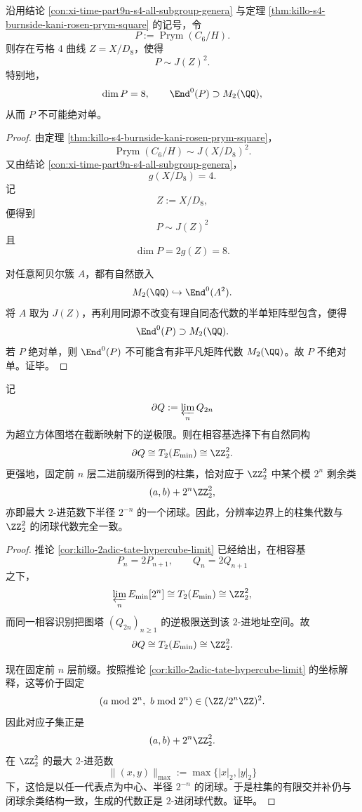 \begin{theorem}\label{thm:xi-time-part9zo-prym-c6h-not-absolutely-simple}
沿用结论 \ref{con:xi-time-part9n-s4-all-subgroup-genera} 与定理 \ref{thm:killo-s4-burnside-kani-rosen-prym-square} 的记号，令
\[
P:=\operatorname{Prym}(C_6/H).
\]
则存在亏格 \(4\) 曲线 \(Z=X/D_8\)，使得
\[
P\sim J(Z)^2.
\]
特别地，
\[
\dim P=8,
\qquad
\End^0(P)\supset M_2(\QQ),
\]
从而 \(P\) 不可能绝对单。
\end{theorem}
\begin{proof}
由定理 \ref{thm:killo-s4-burnside-kani-rosen-prym-square}，
\[
\operatorname{Prym}(C_6/H)\sim J(X/D_8)^2.
\]
又由结论 \ref{con:xi-time-part9n-s4-all-subgroup-genera}，
\[
g(X/D_8)=4.
\]
记
\[
Z:=X/D_8,
\]
便得到
\[
P\sim J(Z)^2
\]
且
\[
\dim P=2g(Z)=8.
\]

对任意阿贝尔簇 \(A\)，都有自然嵌入
\[
M_2(\QQ)\hookrightarrow \End^0(A^2).
\]
将 \(A\) 取为 \(J(Z)\)，再利用同源不改变有理自同态代数的半单矩阵型包含，便得
\[
\End^0(P)\supset M_2(\QQ).
\]
若 \(P\) 绝对单，则 \(\End^0(P)\) 不可能含有非平凡矩阵代数 \(M_2(\QQ)\)。故 \(P\) 不绝对单。证毕。
\end{proof}

\begin{theorem}\label{thm:xi-time-part9zo-dyadic-boundary-cylinder-ball-identification}
记
\[
\partial Q:=\varprojlim_n Q_{2n}
\]
为超立方体图塔在截断映射下的逆极限。则在相容基选择下有自然同构
\[
\partial Q\cong T_2(E_{\min})\cong \ZZ_2^2.
\]
更强地，固定前 \(n\) 层二进前缀所得到的柱集，恰对应于 \(\ZZ_2^2\) 中某个模 \(2^n\) 剩余类
\[
(a,b)+2^n\ZZ_2^2,
\]
亦即最大 \(2\)-进范数下半径 \(2^{-n}\) 的一个闭球。因此，分辨率边界上的柱集代数与 \(\ZZ_2^2\) 的闭球代数完全一致。
\end{theorem}
\begin{proof}
推论 \ref{cor:killo-2adic-tate-hypercube-limit} 已经给出，在相容基
\[
P_n=2P_{n+1},
\qquad
Q_n=2Q_{n+1}
\]
之下，
\[
\varprojlim_n E_{\min}[2^n]\cong T_2(E_{\min})\cong \ZZ_2^2,
\]
而同一相容识别把图塔 \((Q_{2n})_{n\ge 1}\) 的逆极限送到该 \(2\)-进地址空间。故
\[
\partial Q\cong T_2(E_{\min})\cong \ZZ_2^2.
\]

现在固定前 \(n\) 层前缀。按照推论 \ref{cor:killo-2adic-tate-hypercube-limit} 的坐标解释，这等价于固定
\[
(a\bmod 2^n,\ b\bmod 2^n)\in (\ZZ/2^n\ZZ)^2.
\]
因此对应子集正是
\[
(a,b)+2^n\ZZ_2^2.
\]
在 \(\ZZ_2^2\) 的最大 \(2\)-进范数
\[
\|(x,y)\|_{\max}:=\max\{|x|_2,|y|_2\}
\]
下，这恰是以任一代表点为中心、半径 \(2^{-n}\) 的闭球。于是柱集的有限交并补仍与闭球余类结构一致，生成的代数正是 \(2\)-进闭球代数。证毕。
\end{proof}



\endinput
